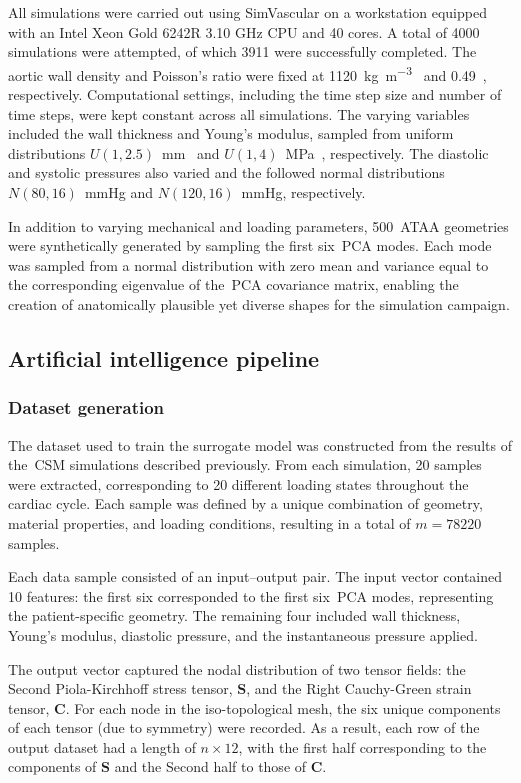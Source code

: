 \documentclass[a4paper,fleqn]{cas-sc}
\begin{document}
  All simulations were carried out using SimVascular on a workstation equipped with an Intel Xeon Gold 6242R 3.10 GHz CPU and 40 cores. A total of 4000 simulations were attempted, of which 3911 were successfully completed. The aortic wall density and Poisson's ratio were fixed at 1120~\si{\kilogram\per\metre\cubed}~\cite{pasta2013,Attaran2018} and 0.49~\cite{farzaneh2019,Baumler2020}, respectively. Computational settings, including the time step size and number of time steps, were kept constant across all simulations. The varying variables included the wall thickness and Young's modulus, sampled from uniform distributions $U(1, 2.5)$~\si{\milli\meter}~\cite{Mensel2014} and $U(1, 4)$~\si{\mega\pascal}~\cite{Duprey2010}, respectively. The diastolic and systolic pressures also varied and the followed normal distributions $N(80, 16)$~\si{\mmHg} and $N(120, 16)$~\si{\mmHg}, respectively.

  In addition to varying mechanical and loading parameters, 500~\gls{ATAA} geometries were synthetically generated by sampling the first six~\gls{PCA} modes. Each mode was sampled from a normal distribution with zero mean and variance equal to the corresponding eigenvalue of the~\gls{PCA} covariance matrix, enabling the creation of anatomically plausible yet diverse shapes for the simulation campaign.

\subsection{Artificial intelligence pipeline}
  \subsubsection{Dataset generation}
    The dataset used to train the surrogate model was constructed from the results of the~\gls{CSM} simulations described previously. From each simulation, 20 samples were extracted, corresponding to 20 different loading states throughout the cardiac cycle. Each sample was defined by a unique combination of geometry, material properties, and loading conditions, resulting in a total of $m = 78220$ samples.

    Each data sample consisted of an input–output pair. The input vector contained 10 features: the first six corresponded to the first six~\gls{PCA} modes, representing the patient-specific geometry. The remaining four included wall thickness, Young's modulus, diastolic pressure, and the instantaneous pressure applied.

    The output vector captured the nodal distribution of two tensor fields: the Second Piola-Kirchhoff stress tensor, $\bm{S}$, and the Right Cauchy-Green strain tensor, $\bm{C}$. For each node in the iso-topological mesh, the six unique components of each tensor (due to symmetry) were recorded. As a result, each row of the output dataset had a length of $n \times 12$, with the first half corresponding to the components of $\bm{S}$ and the Second half to those of $\bm{C}$.
\end{document}
